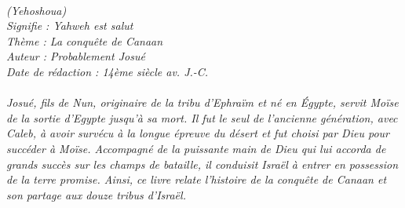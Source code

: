\BFont
\noindent\hrulefill
{\footnotesize
\textit{
\bigskip
{\centering{}
\\(Yehoshoua)
\\Signifie : Yahweh est salut
\\Thème : La conquête de Canaan
\\Auteur : Probablement Josué
\\Date de rédaction : 14ème siècle av. J.-C.\\}
}
\textit{
\\Josué, fils de Nun, originaire de la tribu d’Ephraïm et né en Égypte, servit Moïse de la sortie d’Egypte jusqu’à sa mort. Il fut le seul de l’ancienne génération, avec Caleb, à avoir survécu à la longue épreuve du désert et fut choisi par Dieu pour succéder à Moïse. Accompagné de la puissante main de Dieu qui lui accorda de grands succès sur les champs de bataille, il conduisit Israël à entrer en possession de la terre promise. Ainsi, ce livre relate l’histoire de la conquête de Canaan et son partage aux douze tribus d’Israël.\bigskip
}
}
\par\nobreak\noindent\hrulefill
